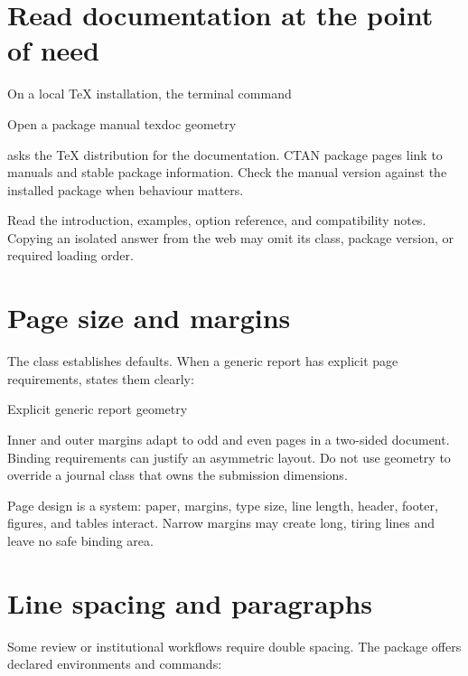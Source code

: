 \section{Read documentation at the point of need}

On a local TeX installation, the terminal command

\begin{terminalcode}{Open a package manual}
texdoc geometry
\end{terminalcode}

asks the TeX distribution for the  documentation. CTAN package
pages link to manuals and stable package information. Check the manual version
against the installed package when behaviour matters.

Read the introduction, examples, option reference, and compatibility notes.
Copying an isolated answer from the web may omit its class, package version, or
required loading order.

\section{Page size and margins}

The class establishes defaults. When a generic report has explicit page
requirements,  states them clearly:

\begin{latexcode}{Explicit generic report geometry}
\usepackage[
  a4paper,
  inner=30mm,
  outer=25mm,
  top=25mm,
  bottom=25mm,
  headheight=15pt
]{geometry}
\end{latexcode}

Inner and outer margins adapt to odd and even pages in a two-sided document.
Binding requirements can justify an asymmetric layout. Do not use geometry to
override a journal class that owns the submission dimensions.

Page design is a system: paper, margins, type size, line length, header, footer,
figures, and tables interact. Narrow margins may create long, tiring lines and
leave no safe binding area.

\section{Line spacing and paragraphs}

Some review or institutional workflows require double spacing. The
 package offers declared environments and commands:

